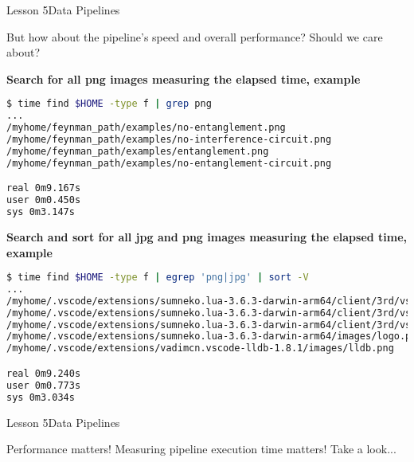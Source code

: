 \documentclass[aspectratio=1610]{beamer}
\begin{document}
\begin{frame}{Lesson 5}{Data Pipelines}
\Huge
\begin{center}
But how about the pipeline's \alert{speed} and overall
\alert{performance}? Should we care about?
\end{center}
\end{frame}



\begin{frame}[fragile]
\LARGE
\textbf{Search for all png images measuring the elapsed time, example}\\
\Large
\begin{lstlisting}[language=sh]
$ time find $HOME -type f | grep png
...
/myhome/feynman_path/examples/no-entanglement.png
/myhome/feynman_path/examples/no-interference-circuit.png
/myhome/feynman_path/examples/entanglement.png
/myhome/feynman_path/examples/no-entanglement-circuit.png

real 0m9.167s
user 0m0.450s
sys 0m3.147s
\end{lstlisting}
\end{frame}



\begin{frame}[fragile]
\LARGE
\textbf{Search  and sort for all jpg and png images measuring the elapsed time, example}\\
\Large
\begin{lstlisting}[language=sh]
$ time find $HOME -type f | egrep 'png|jpg' | sort -V
...
/myhome/.vscode/extensions/sumneko.lua-3.6.3-darwin-arm64/client/3rd/vscode-lua-doc/doc/en-us/53/osi-certified-72x60.png
/myhome/.vscode/extensions/sumneko.lua-3.6.3-darwin-arm64/client/3rd/vscode-lua-doc/doc/en-us/54/osi-certified-72x60.png
/myhome/.vscode/extensions/sumneko.lua-3.6.3-darwin-arm64/client/3rd/vscode-lua-doc/doc/zh-cn/53/osi-certified-72x60.png
/myhome/.vscode/extensions/sumneko.lua-3.6.3-darwin-arm64/images/logo.png
/myhome/.vscode/extensions/vadimcn.vscode-lldb-1.8.1/images/lldb.png

real 0m9.240s
user 0m0.773s
sys 0m3.034s
\end{lstlisting}
\end{frame}


\begin{frame}{Lesson 5}{Data Pipelines}
\Huge
\begin{center}
Performance matters! Measuring pipeline execution time matters!
Take a look... 
\end{center}
\end{frame}
\end{document}
